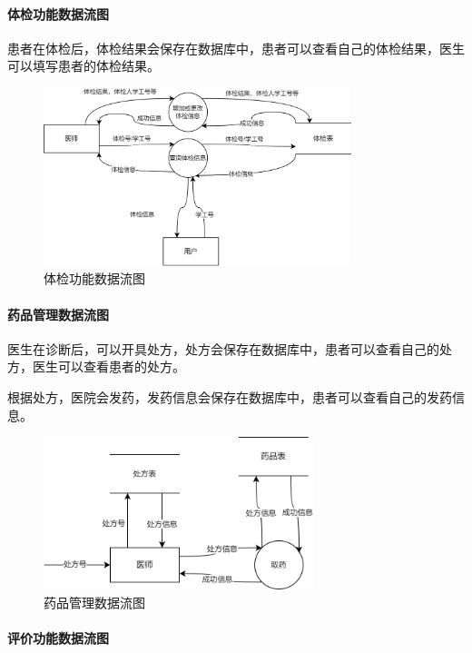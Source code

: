 \documentclass{article}
\begin{document}
\paragraph{体检功能数据流图}

患者在体检后，体检结果会保存在数据库中，患者可以查看自己的体检结果，医生可以填写患者的体检结果。

\begin{figure}[H]
    \centering
    \includegraphics[width=0.8\textwidth]{images/examination_dataflow.png}
    \caption{体检功能数据流图}
\end{figure}

\paragraph{药品管理数据流图}

医生在诊断后，可以开具处方，处方会保存在数据库中，患者可以查看自己的处方，医生可以查看患者的处方。

根据处方，医院会发药，发药信息会保存在数据库中，患者可以查看自己的发药信息。
\begin{figure}[H]
    \centering
    \includegraphics[width=0.7\textwidth]{images/drug_dataflow.png}
    \caption{药品管理数据流图}
\end{figure}

\paragraph{评价功能数据流图}
\end{document}
